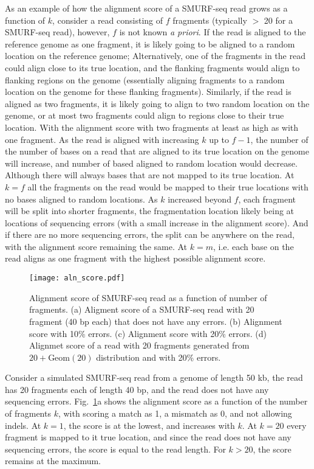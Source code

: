 As an example of how the alignment score of a SMURF-seq read grows as a
function of $k$, consider a read consisting of $f$ fragments (typically
$>$ 20 for a SMURF-seq read), however, $f$ is not known \emph{a priori}.
If the read is aligned to the reference genome as one fragment, it is
likely going to be aligned to a random location on the reference genome;
Alternatively, one of the fragments in the read could align close to its
true location, and the flanking fragments would align to flanking
regions on the genome (essentially aligning fragments to a random
location on the genome for these flanking fragments).
Similarly, if the read is aligned as two fragments, it is likely going
to align to two random location on the genome, or at most two fragments
could align to regions close to their true location. With the alignment
score with two fragments at least as high as with one fragment.
As the read is aligned with increasing $k$ up to $f-1$, the number of
the number of bases on a read that are aligned to its true location on
the genome will increase, and number of based aligned to random location
would decrease. Although there will always bases that are not mapped to
its true location.
At $k=f$ all the fragments on the read would be mapped to their true
locations with no bases aligned to random locations.
As $k$ increased beyond $f$, each fragment will be split into shorter
fragments, the fragmentation location likely being at locations of
sequencing errors (with a small increase in the alignment score). And if
there are no more sequencing errors, the split can be anywhere on the
read, with the alignment score remaining the same.
At $k=m$, i.e. each base on the read aligns as one fragment with the
highest possible alignment score.

\begin{figure}[t!]
\centering
\texttt{[image: aln\_score.pdf]}
\caption[Alignment score of SMURF-seq read as a function of number of
  fragments]{
  Alignment score of SMURF-seq read as a function of number of
  fragments.
  (a) Aligment score of a SMURF-seq read with 20 fragment (40 bp each)
  that does not have any errors.
  (b) Alignment score with 10\% errors.
  (c) Alignment score with 20\% errors.
  (d) Alignmet score of a read with 20 fragments generated from $20 +
  \text{Geom}(20)$ distribution and with 20\% errors.}
\label{aln_score}
\end{figure}

Consider a simulated SMURF-seq read from a genome of length 50 kb, the
read has 20 fragments each of length 40 bp, and the read does not have
any sequencing errors. Fig.~\ref{aln_score}a shows the alignment score
as a function of the number of fragments $k$, with scoring a match as
1, a mismatch as 0, and not allowing indels. At $k=1$, the score is at
the lowest, and increases with $k$. At $k=20$ every fragment is mapped
to it true location, and since the read does not have any sequencing
errors, the score is equal to the read length. For $k > 20$, the score
remains at the maximum.


